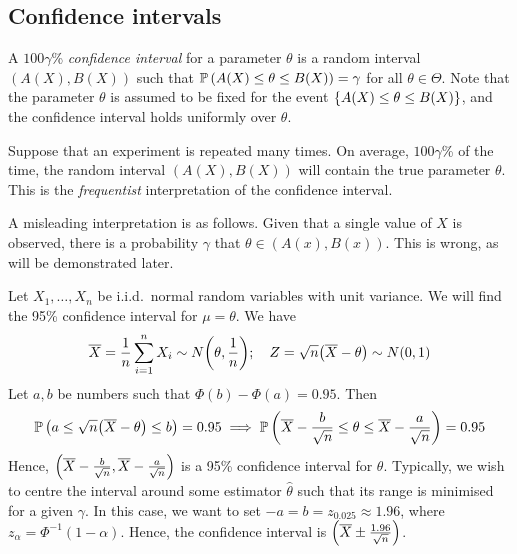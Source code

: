 \subsection{Confidence intervals}
\begin{definition}
	A \( 100 \gamma \)\% \textit{confidence interval} for a parameter \( \theta \) is a random interval \( (A(X), B(X)) \) such that \( \mathbb{P}\left({A(X) \leq \theta \leq B(X)}\right) = \gamma \) for all \( \theta \in \Theta \).
	Note that the parameter \( \theta \) is assumed to be fixed for the event \( \qty{A(X) \leq \theta \leq B(X)} \), and the confidence interval holds uniformly over \( \theta \).
\end{definition}
\begin{remark}
	Suppose that an experiment is repeated many times.
	On average, \( 100 \gamma \)\% of the time, the random interval \( (A(X), B(X)) \) will contain the true parameter \( \theta \).
	This is the \textit{frequentist} interpretation of the confidence interval.

	A misleading interpretation is as follows.
	Given that a single value of \( X \) is observed, there is a probability \( \gamma \) that \( \theta \in (A(x), B(x)) \).
	This is wrong, as will be demonstrated later.
\end{remark}
\begin{example}
	Let \( X_1, \dots, X_n \) be i.i.d.\ normal random variables with unit variance.
	We will find the 95\% confidence interval for \( \mu = \theta \).
	We have
	\[ \overline X = \frac{1}{n} \sum_{i=1}^n X_i \sim N\qty(\theta, \frac{1}{n});\quad Z = \sqrt{n}\qty(\overline X - \theta) \sim N(0,1) \]
	Let \( a, b \) be numbers such that \( \Phi(b) - \Phi(a) = 0.95 \).
	Then
	\[ \mathbb{P}\left({a \leq \sqrt{n} \qty(\overline X - \theta) \leq b}\right) = 0.95 \implies \mathbb{P}\left({\overline X - \frac{b}{\sqrt{n}} \leq \theta \leq \overline X - \frac{a}{\sqrt{n}}}\right) = 0.95 \]
	Hence, \( \qty(\overline X - \frac{b}{\sqrt{n}}, \overline X - \frac{a}{\sqrt{n}}) \) is a 95\% confidence interval for \( \theta \).
	Typically, we wish to centre the interval around some estimator \( \hat\theta \) such that its range is minimised for a given \( \gamma \).
	In this case, we want to set \( -a = b = z_{0.025} \approx 1.96 \), where \( z_\alpha = \Phi^{-1}(1-\alpha) \).
	Hence, the confidence interval is \( \qty(\overline X \pm \frac{1.96}{\sqrt{n}}) \).
\end{example}
